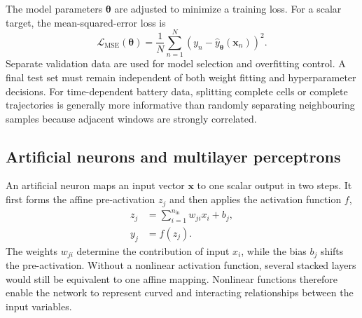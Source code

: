 \documentclass[
    a4paper,
    12pt,
    titlepage,
    bibliography=totoc,
    twoside=on,
    parskip=false,
    numbers=noenddot,
    cleardoublepage=empty,
    DIV=12,
    BCOR=12.0mm,
    headheight=36pt,
    headings=openright
]{scrreprt}
\begin{document}
The model parameters $\boldsymbol{\theta}$ are adjusted to minimize a training loss. For a scalar target, the mean-squared-error loss is
\begin{equation}
    \mathcal{L}_{\mathrm{MSE}}(\boldsymbol{\theta})
    =
    \frac{1}{N}\sum_{n=1}^{N}
    \left(y_n-\widehat y_{\boldsymbol{\theta}}(\mathbf{x}_n)\right)^2.
    \label{eq:fundamental_mse}
\end{equation}
Separate validation data are used for model selection and overfitting control. A final test set must remain independent of both weight fitting and hyperparameter decisions. For time-dependent battery data, splitting complete cells or complete trajectories is generally more informative than randomly separating neighbouring samples because adjacent windows are strongly correlated.\autocite{hossainlipuDatadrivenStateCharge2020,zhaoReviewLithiumIonBattery2024}

\subsection{Artificial neurons and multilayer perceptrons}
\label{sec:fundamental_mlp}
An artificial neuron maps an input vector $\mathbf{x}$ to one scalar output in two steps. It first forms the affine pre-activation $z_j$ and then applies the activation function $f$,
\begin{equation}
    \begin{aligned}
        z_j&=\sum_{i=1}^{n_{\mathrm{in}}}w_{ji}x_i+b_j,\\
        y_j&=f(z_j).
    \end{aligned}
    \label{eq:fundamental_neuron}
\end{equation}
The weights $w_{ji}$ determine the contribution of input $x_i$, while the bias $b_j$ shifts the pre-activation. Without a nonlinear activation function, several stacked layers would still be equivalent to one affine mapping. Nonlinear functions therefore enable the network to represent curved and interacting relationships between the input variables.
\end{document}
